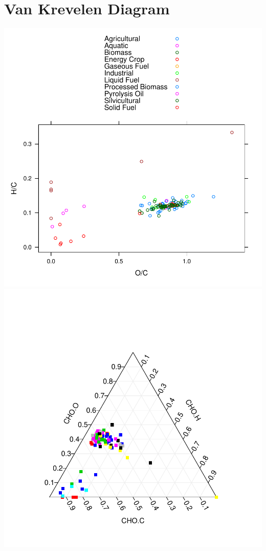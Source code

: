 \documentclass[a4paper]{article}
\begin{document}
\section{Van Krevelen Diagram}
\includegraphics{images/img-002}
\\
\includegraphics{images/img-003}
\end{document}
